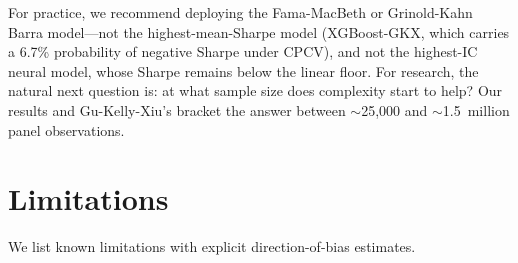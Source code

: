 \documentclass[11pt]{article}
\begin{document}
For practice, we recommend deploying the Fama-MacBeth or
Grinold-Kahn Barra model---not the highest-mean-Sharpe model
(XGBoost-GKX, which carries a 6.7\% probability of negative Sharpe
under CPCV), and not the highest-IC neural model, whose Sharpe remains
below the linear floor. For research, the natural next question is: at
what sample size does complexity start to help? Our results and
Gu-Kelly-Xiu's bracket the answer between $\sim$25{,}000 and
$\sim$1.5~million panel observations.

\section{Limitations}\label{sec:limitations}

We list known limitations with explicit direction-of-bias estimates.
\end{document}

